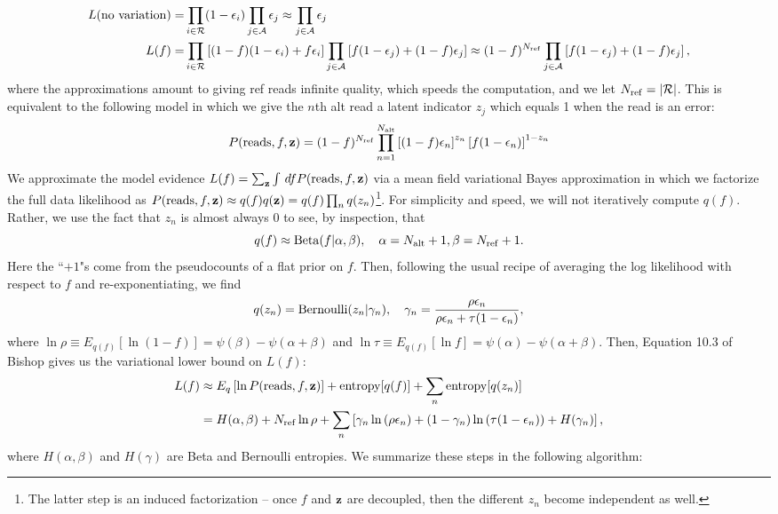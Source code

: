 \documentclass[nofootinbib,amssymb,amsmath]{revtex4}
\newcommand{\vz}{{\bf z}}
\begin{document}
\begin{align}
L({\rm no~variation}) =& \prod_{i \in \mathcal{R}} (1 - \epsilon_i) \prod_{j \in \mathcal{A}} \epsilon_j \approx \prod_{j \in \mathcal{A}} \epsilon_j \\
L(f) =& \prod_{i \in \mathcal{R}} \left[ (1 -f)(1 - \epsilon_i) + f \epsilon_i \right] \prod_{j \in \mathcal{A}} \left[f(1 - \epsilon_j) + (1 - f) \epsilon_j \right]
\approx (1-f)^{N_{\rm ref}} \prod_{j \in \mathcal{A}} \left[f(1 - \epsilon_j) + (1 - f) \epsilon_j \right],
\end{align}
where the approximations amount to giving ref reads infinite quality, which speeds the computation, and we let $N_{\rm ref} = | \mathcal{R}|$.  This is equivalent to the following model in which we give the $n$th alt read a latent indicator $z_j$ which equals 1 when the read is an error:
\begin{align}
P({\rm reads}, f, \vz) = (1-f)^{N_{\rm ref}} \prod_{n=1}^{N_{\rm alt}} \left[ (1-f)\epsilon_n \right]^{z_n} \left[ f (1 - \epsilon_n) \right]^{1 - z_n}
\end{align}
We approximate the model evidence $L(f) = \sum_\vz \int \, df P({\rm reads}, f, \vz)$ via a mean field variational Bayes approximation in which we factorize the full data likelihood as $P({\rm reads}, f, \vz) \approx q(f) q(\vz) = q(f) \prod_n q(z_n)$\footnote{The latter step is an induced factorization -- once $f$ and $\vz$ are decoupled, then the different $z_n$ become independent as well.}.  For simplicity and speed, we will not iteratively compute $q(f)$.  Rather, we use the fact that $z_n$ is almost always 0 to see, by inspection, that
\begin{equation}
q(f) \approx {\rm Beta}(f | \alpha, \beta), \quad \alpha = N_{\rm alt} + 1, \beta = N_{\rm ref} + 1.
\end{equation}
Here the ``$+1$"s come from the pseudocounts of a flat prior on $f$.  Then, following the usual recipe of averaging the log likelihood with respect to $f$ and re-exponentiating, we find
\begin{equation}
q(z_n) = {\rm Bernoulli}(z_n | \gamma_n), \quad \gamma_n = \frac{ \rho \epsilon_n}{\rho \epsilon_n + \tau (1 - \epsilon_n)},
\end{equation}
where $\ln \rho \equiv E_{q(f)}\left[ \ln (1 - f) \right] = \psi(\beta) - \psi(\alpha + \beta)$ and $\ln \tau \equiv E_{q(f)}\left[ \ln f \right] = \psi(\alpha) - \psi(\alpha + \beta)$.  Then, Equation 10.3 of Bishop gives us the variational lower bound on $L(f)$:
\begin{align}
L(f) &\approx E_q \left[ \ln P({\rm reads}, f, \vz) \right] + {\rm entropy}[q(f)] + \sum_n {\rm entropy}[q(z_n)] \\
&= H(\alpha, \beta) +  N_{\rm ref} \ln \rho + \sum_n \left[ \gamma_n \ln \left( \rho \epsilon_n \right) + (1 - \gamma_n) \ln \left( \tau (1 - \epsilon_n) \right) + H(\gamma_n) \right],
\end{align}
where $H(\alpha, \beta)$ and $H(\gamma)$ are Beta and Bernoulli entropies.  We summarize these steps in the following algorithm:
\end{document}
